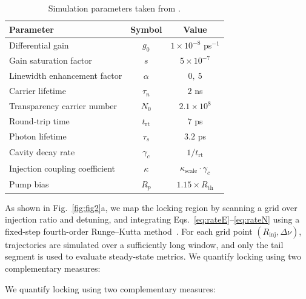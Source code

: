 \documentclass[%
 aip,
 apl,
 amsmath,amssymb,
 reprint,%
 floatfix,
]{revtex4-1}
\begin{document}
\begin{table}[htbp]
\centering
\caption{Simulation parameters taken from \cite{Fragkos2012JLT_AmpLimiter_OIL}.}
\label{tab:fragkos_params}
\begin{tabular}{lcc}
\hline
\textbf{Parameter} & \textbf{Symbol} & \textbf{Value} \\
\hline
Differential gain & $g_0$ & $1\times10^{-8}$ ps$^{-1}$ \\
Gain saturation factor & $s$ & $5\times10^{-7}$ \\
Linewidth enhancement factor & $\alpha$ & $0,\ 5$ \\
Carrier lifetime & $\tau_n$ & $2$ ns \\
Transparency carrier number & $N_0$ & $2.1\times10^8$ \\
Round-trip time & $t_{\mathrm{rt}}$ & $7$ ps \\
Photon lifetime & $\tau_s$ & $3.2$ ps \\
Cavity decay rate & $\gamma_c$ & $1/t_{\mathrm{rt}}$ \\
Injection coupling coefficient & $\kappa$ & $\kappa_{\mathrm{scale}}\cdot \gamma_c$ \\
Pump bias & $R_p$ & $1.15\times R_{\mathrm{th}}$ \\

\hline
\end{tabular}
\end{table}

As shown in Fig.~\ref{fig:fig2}a, we map the locking region by scanning a grid over injection ratio and detuning, and integrating Eqs.~\eqref{eq:rateE}--\eqref{eq:rateN} using a fixed-step fourth-order Runge--Kutta method~\cite{Dong2024RC_QDLaser}. For each grid point $(R_{\mathrm{inj}},\Delta\nu)$, trajectories are simulated over a sufficiently long window, and only the tail segment is used to evaluate steady-state metrics. We quantify locking using two complementary measures:

We quantify locking using two complementary measures:
\end{document}
